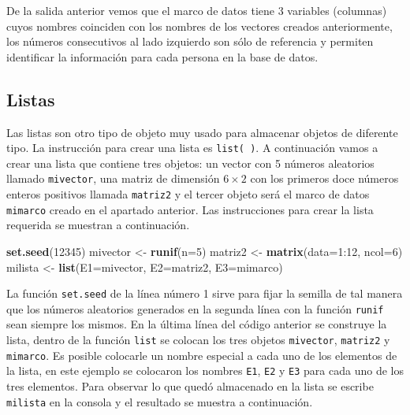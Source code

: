 \documentclass[10pt,]{krantz}
\makeatletter
\newenvironment{Shaded}{\begin{snugshade}}{\end{snugshade}}
\newcommand{\KeywordTok}[1]{\textcolor[rgb]{0.13,0.29,0.53}{\textbf{{#1}}}}
\newcommand{\DataTypeTok}[1]{\textcolor[rgb]{0.13,0.29,0.53}{{#1}}}
\newcommand{\DecValTok}[1]{\textcolor[rgb]{0.00,0.00,0.81}{{#1}}}
\newcommand{\StringTok}[1]{\textcolor[rgb]{0.31,0.60,0.02}{{#1}}}
\newcommand{\NormalTok}[1]{{#1}}
\newenvironment{kframe}{%
\medskip{}
\setlength{\fboxsep}{.8em}
 \def\at@end@of@kframe{}%
 \ifinner\ifhmode%
  \def\at@end@of@kframe{\end{minipage}}%
  \begin{minipage}{\columnwidth}%
 \fi\fi%
 \def\FrameCommand##1{\hskip\@totalleftmargin \hskip-\fboxsep
 \colorbox{shadecolor}{##1}\hskip-\fboxsep
     \hskip-\linewidth \hskip-\@totalleftmargin \hskip\columnwidth}%
 \MakeFramed {\advance\hsize-\width
   \@totalleftmargin\z@ \linewidth\hsize
   \@setminipage}}%
 {\par\unskip\endMakeFramed%
 \at@end@of@kframe}
\renewenvironment{Shaded}{\begin{kframe}}{\end{kframe}}
\makeatother
\begin{document}
De la salida anterior vemos que el marco de datos tiene 3 variables
(columnas) cuyos nombres coinciden con los nombres de los vectores
creados anteriormente, los números consecutivos al lado izquierdo son
sólo de referencia y permiten identificar la información para cada
persona en la base de datos.

\subsection{Listas}

Las listas  son otro tipo de objeto muy usado para
almacenar objetos de diferente tipo. La instrucción para crear una lista
es \texttt{list(\ )}. A continuación vamos a crear una lista que
contiene tres objetos: un vector con 5 números aleatorios llamado
\texttt{mivector}, una matriz de dimensión \(6 \times 2\) con los
primeros doce números enteros positivos llamada \texttt{matriz2} y el
tercer objeto será el marco de datos \texttt{mimarco} creado en el
apartado anterior. Las instrucciones para crear la lista requerida se
muestran a continuación.

\begin{Shaded}
\begin{Highlighting}[]
\KeywordTok{set.seed}\NormalTok{(}\DecValTok{12345}\NormalTok{)}
\NormalTok{mivector <-}\StringTok{ }\KeywordTok{runif}\NormalTok{(}\DataTypeTok{n=}\DecValTok{5}\NormalTok{)}
\NormalTok{matriz2 <-}\StringTok{ }\KeywordTok{matrix}\NormalTok{(}\DataTypeTok{data=}\DecValTok{1}\NormalTok{:}\DecValTok{12}\NormalTok{, }\DataTypeTok{ncol=}\DecValTok{6}\NormalTok{)}
\NormalTok{milista <-}\StringTok{ }\KeywordTok{list}\NormalTok{(}\DataTypeTok{E1=}\NormalTok{mivector, }\DataTypeTok{E2=}\NormalTok{matriz2, }\DataTypeTok{E3=}\NormalTok{mimarco)}
\end{Highlighting}
\end{Shaded}

La función \texttt{set.seed} de la línea número 1 sirve para fijar la
semilla de tal manera que los números aleatorios generados en la segunda
línea con la función \texttt{runif} sean siempre los mismos. En la
última línea del código anterior se construye la lista, dentro de la
función \texttt{list} se colocan los tres objetos \texttt{mivector},
\texttt{matriz2} y \texttt{mimarco}. Es posible colocarle un nombre
especial a cada uno de los elementos de la lista, en este ejemplo se
colocaron los nombres \texttt{E1}, \texttt{E2} y \texttt{E3} para cada
uno de los tres elementos. Para observar lo que quedó almacenado en la
lista se escribe \texttt{milista} en la consola y el resultado se
muestra a continuación.
\end{document}
